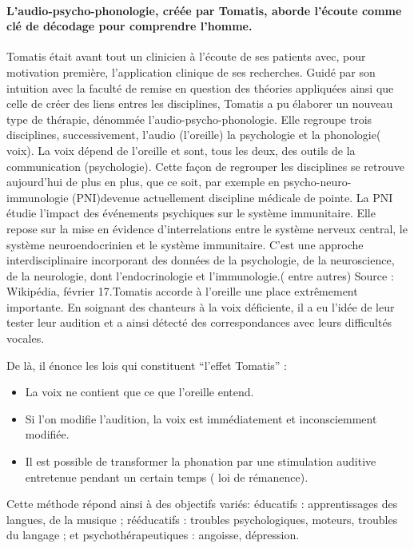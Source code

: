 \documentclass[12pt,french]{report}
\makeatletter
\let\SF@@footnote\footnote
\def\footnote{\ifx\protect\@typeset@protect
    \expandafter\SF@@footnote
  \else
    \expandafter\SF@gobble@opt
  \fi
}
\edef\SF@gobble@opt{\noexpand\protect
  \expandafter\noexpand\csname SF@gobble@opt \endcsname}
\makeatother
\begin{document}
\paragraph{L'audio-psycho-phonologie, créée par Tomatis, aborde l'écoute comme
clé de décodage pour comprendre l'homme.}

Tomatis était avant tout un clinicien à l'écoute de ses patients avec,
pour motivation première, l'application clinique de ses recherches.
Guidé par son intuition avec la faculté de remise en question des
théories appliquées ainsi que celle de créer des liens entres les
disciplines, Tomatis a pu élaborer un nouveau type de thérapie, dénommée
l'audio-psycho-phonologie. Elle regroupe trois disciplines, successivement,
l'audio (l'oreille) la psychologie et la phonologie( voix). La voix
dépend de l'oreille et sont, tous les deux, des outils de la communication
(psychologie). Cette façon de regrouper les disciplines se retrouve
aujourd'hui de plus en plus, que ce soit, par exemple en psycho-neuro-immunologie
(PNI)devenue actuellement discipline médicale de pointe.\footnote{La PNI étudie l'impact des événements psychiques sur le système immunitaire.
Elle repose sur la mise en évidence d'interrelations entre le système
nerveux central, le système neuroendocrinien et le système immunitaire.
C'est une approche interdisciplinaire incorporant des données de la
psychologie, de la neuroscience, de la neurologie, dont l'endocrinologie
et l'immunologie.( entre autres) Source : Wikipédia, février 17.}Tomatis accorde à l'oreille une place extrêmement importante. En soignant
des chanteurs à la voix déficiente, il a eu l'idée de leur tester
leur audition et a ainsi détecté des correspondances avec leurs difficultés
vocales.

De là, il énonce les lois qui constituent ``l'effet Tomatis'' : 
\begin{itemize}
\item La voix ne contient que ce que l'oreille entend.
\item Si l'on modifie l'audition, la voix est immédiatement et inconsciemment
modifiée.
\item Il est possible de transformer la phonation par une stimulation auditive
entretenue pendant un certain temps ( loi de rémanence).
\end{itemize}
Cette méthode répond ainsi à des objectifs variés: éducatifs : apprentissages
des langues, de la musique ; rééducatifs : troubles psychologiques,
moteurs, troubles du langage ; et psychothérapeutiques : angoisse,
dépression. 
\end{document}
